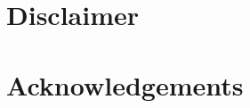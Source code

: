 \documentclass{report}
\begin{document}
\section*{Disclaimer}

\section*{Acknowledgements}

\newpage

\singlespacing{}

\doublespacing{}
\tableofcontents
\singlespacing{}
\newpage

\onehalfspacing

\titlespacing*{\chapter}{0pt}{40pt}{40pt}






\end{document}
